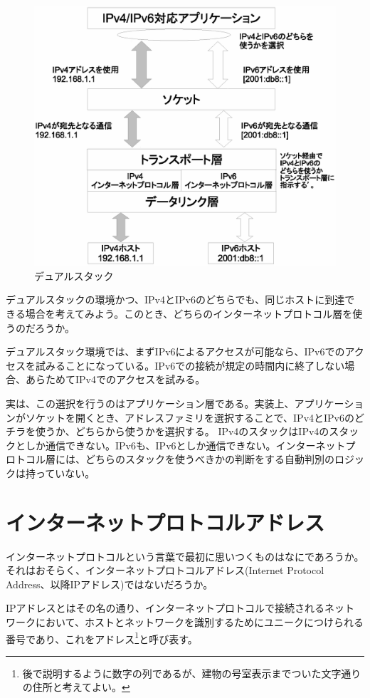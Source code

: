 \begin{figure}[htbp]
	\includegraphics[width=12cm,clip]{draw/doublebind.eps}
	\caption{デュアルスタック}
	\label{fig:dualstack}
\end{figure}

デュアルスタックの環境かつ、IPv4とIPv6のどちらでも、同じホストに到達できる場合を考えてみよう。このとき、どちらのインターネットプロトコル層を使うのだろうか。

デュアルスタック環境では、まずIPv6によるアクセスが可能なら、IPv6でのアクセスを試みることになっている。IPv6での接続が規定の時間内に終了しない場合、あらためてIPv4でのアクセスを試みる。

実は、この選択を行うのはアプリケーション層である。実装上、アプリケーションがソケットを開くとき、アドレスファミリを選択することで、IPv4とIPv6のどチラを使うか、どちらから使うかを選択する。
IPv4のスタックはIPv4のスタックとしか通信できない。IPv6も、IPv6としか通信できない。インターネットプロトコル層には、どちらのスタックを使うべきかの判断をする自動判別のロジックは持っていない。


\section{インターネットプロトコルアドレス}

インターネットプロトコルという言葉で最初に思いつくものはなにであろうか。それはおそらく、インターネットプロトコルアドレス(Internet Protocol Address、以降IPアドレス)ではないだろうか。

IPアドレスとはその名の通り、インターネットプロトコルで接続されるネットワークにおいて、ホストとネットワークを識別するためにユニークにつけられる番号であり、これをアドレス\footnote{後で説明するように数字の列であるが、建物の号室表示までついた文字通りの住所と考えてよい。}と呼び表す。

